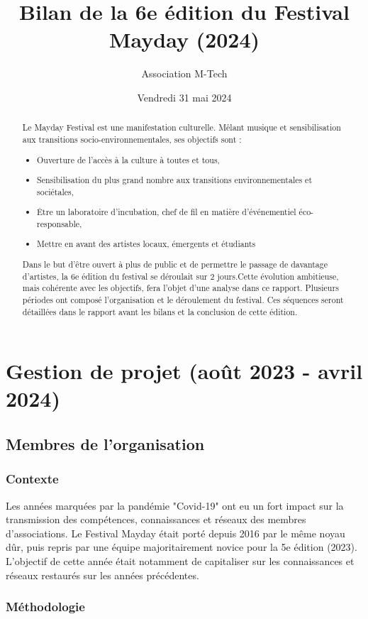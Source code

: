 \documentclass[12pt,a4paper]{report}
\title{Bilan de la 6e édition du Festival Mayday (2024)}
\author{Association M-Tech}
\date{Vendredi 31 mai 2024}
\begin{document}
\maketitle

\begin{abstract}
Le Mayday Festival est une manifestation culturelle. Mêlant musique et sensibilisation aux transitions socio-environnementales, ses objectifs sont :
\begin{itemize}
\item Ouverture de l'accès à la culture à toutes et tous,
\item Sensibilisation du plus grand nombre aux transitions environnementales et sociétales,
\item Être un laboratoire d'incubation, chef de fil en matière d'événementiel éco-responsable,
\item Mettre en avant des artistes locaux, émergents et étudiants
\end{itemize}
Dans le but d'être ouvert à plus de public et de permettre le passage de davantage d'artistes, la 6e édition du festival se déroulait sur 2 jours.Cette évolution ambitieuse, mais cohérente avec les objectifs, fera l'objet d'une analyse dans ce rapport.
Plusieurs périodes ont composé l'organisation et le déroulement du festival. Ces séquences seront détaillées dans le rapport avant les bilans et la conclusion de cette édition.
\end{abstract}

\part{Gestion de projet (août 2023 - avril 2024)}
\chapter{Membres de l'organisation}
\section{Contexte}
Les années marquées par la pandémie "Covid-19" ont eu un fort impact sur la transmission des compétences, connaissances et réseaux des membres d'associations. Le Festival Mayday était porté depuis 2016 par le même noyau dûr, puis repris par une équipe majoritairement novice pour la 5e édition (2023). L'objectif de cette année était notamment de capitaliser sur les connaissances et réseaux restaurés sur les années précédentes. 

\section{Méthodologie}
\end{document}
